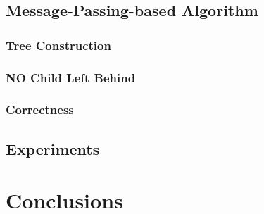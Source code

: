 \documentclass[10pt]{beamer}
\begin{document}




%






\subsection[Algorithm3]{Message-Passing-based Algorithm}



\subsubsection[Algorithm3: Tree]{Tree Construction}



\subsubsection[Algorithm3: Motion Strategy]{NO Child Left Behind}



\subsubsection[Algorithm3: Correctness]{Correctness}





\subsection[Experiments]{Experiments}




\section{Conclusions}



\end{document}
